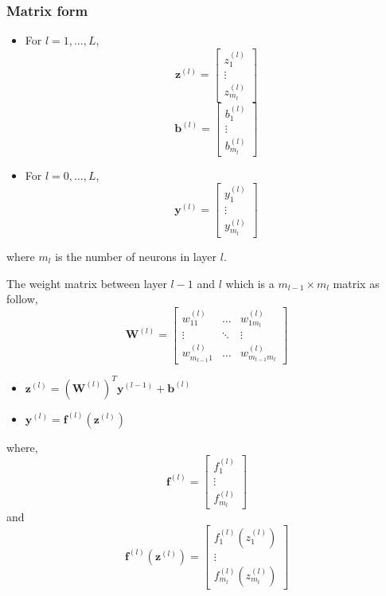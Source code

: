 \documentclass[12pt,aspectratio=169]{beamer}
\begin{document}
\begin{frame}
\frametitle{Matrix form}
\begin{itemize}
\item For $l=1,\dots, L$,
\[
\mathbf{z}^{(l)}=
\begin{bmatrix}
z_1^{(l)}\\
\vdots\\
z_{m_l}^{(l)}
\end{bmatrix}
\]\pause
\[
\mathbf{b}^{(l)}=
\begin{bmatrix}
b_1^{(l)}\\
\vdots\\
b_{m_l}^{(l)}
\end{bmatrix}
\]\pause
\item For $l=0,\dots, L$,
\[
\mathbf{y}^{(l)}=
\begin{bmatrix}
y_1^{(l)}\\
\vdots\\
y_{m_l}^{(l)}
\end{bmatrix}
\]
\end{itemize}
where $m_l$ is the number of neurons in layer $l$.
\end{frame}

\begin{frame}
The weight matrix between layer $l-1$ and $l$ which is a $m_{l-1}\times m_l$ matrix as follow,
\[
\mathbf{W}^{(l)}=
\begin{bmatrix}
w_{11}^{(l)} & \dots & w_{1m_l}^{(l)}\\
\vdots & \ddots & \vdots\\
w_{m_{l-1}1}^{(l)} & \dots & w_{m_{l-1}m_l}^{(l)}
\end{bmatrix}
\]

\end{frame}

\begin{frame}
\begin{itemize}
\item $\mathbf{z}^{(l)}=(\mathbf{W}^{(l)})^T\mathbf{y}^{(l-1)}+\mathbf{b}^{(l)}$ \pause
\bigskip
\item $\mathbf{y}^{(l)}=\mathbf{f}^{(l)}(\mathbf{z}^{(l)})$
\bigskip
\end{itemize}
where, \pause
\[
\mathbf{f}^{(l)}=
\begin{bmatrix}
f_1^{(l)}\\
\vdots\\
f_{m_l}^{(l)}
\end{bmatrix}
\]
and\pause
\[
\mathbf{f}^{(l)}(\mathbf{z}^{(l)})=
\begin{bmatrix}
f_1^{(l)}(z_1^{(l)})\\
\vdots\\
f_{m_l}^{(l)}(z_{m_l}^{(l)})
\end{bmatrix}
\] 

\end{frame}
\end{document}
